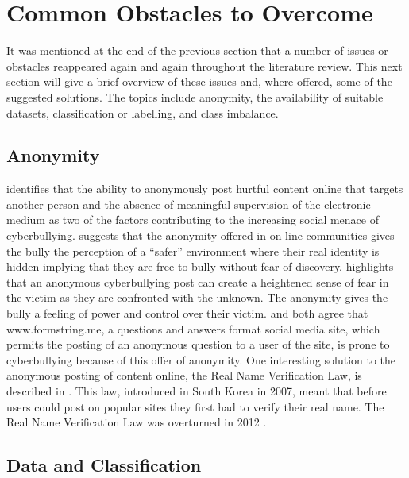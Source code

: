 \section{Common Obstacles to Overcome}
\label{section:3.3}

It was mentioned at the end of the previous section that a number of issues or obstacles reappeared again and again throughout the literature review. This next section will give a brief overview of these issues and, where offered, some of the suggested solutions. The topics include anonymity, the availability of suitable datasets, classification or labelling, and class imbalance.

\subsection{Anonymity}

\citet{dinakar_modeling_2011} identifies that the ability to anonymously post hurtful content online that targets another person and the absence of meaningful supervision of the electronic medium as two of the factors contributing to the increasing social menace of cyberbullying. \citet{yin_detection_2009} suggests that the anonymity offered in on-line communities gives the bully the perception of a ``safer'' environment where their real identity is hidden implying that they are free to bully without fear of discovery. \citet{nahar_effective_2013} highlights that an anonymous cyberbullying post can create a heightened sense of fear in the victim as they are confronted with the unknown. The anonymity gives the bully a feeling of power and control over their victim. \citet{reynolds_using_2011} and \citet{kontostathis_detecting_2013} both agree that www.formstring.me, a questions and answers format social media site, which permits the posting of an anonymous question to a user of the site, is prone to cyberbullying because of this offer of anonymity. One interesting solution to the anonymous posting of content online, the Real Name Verification Law, is described in \citet{cho_empirical_2012}. This law, introduced in South Korea in 2007, meant that before users could post on popular sites they first had to verify their real name. The Real Name Verification Law was overturned in 2012 \cite{sang-hun_south_2012}.

\subsection{Data and Classification}

